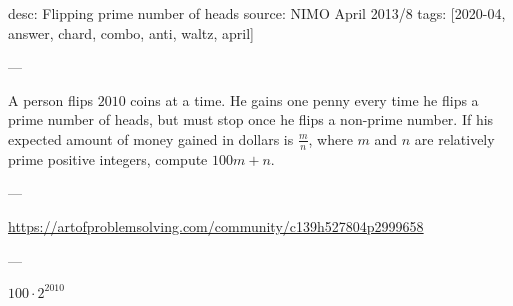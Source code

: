 desc: Flipping prime number of heads
source: NIMO April 2013/8
tags: [2020-04, answer, chard, combo, anti, waltz, april]

---

A person flips $2010$ coins at a time. He gains one penny every time he flips a prime number of heads, but must stop once he flips a non-prime number. If his expected amount of money gained in dollars is $\frac mn$, where $m$ and $n$ are relatively prime positive integers, compute $100m+n$.

---

\url{https://artofproblemsolving.com/community/c139h527804p2999658}

---

$100\cdot2^{2010}$
